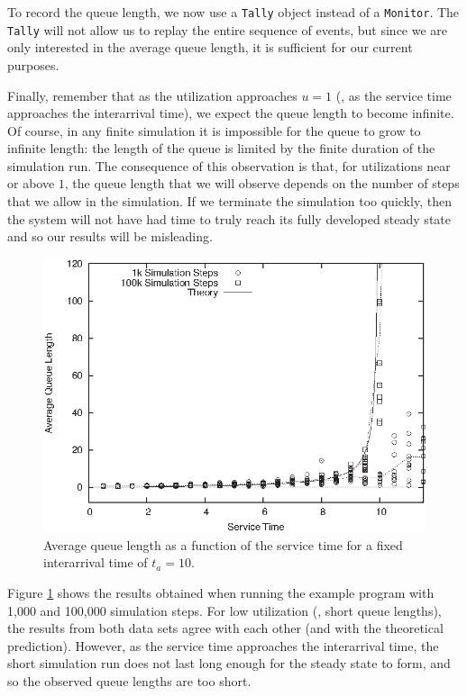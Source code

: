 To record the queue length, we now use a \texttt{Tally} object  instead
of a \texttt{Monitor}. The \texttt{Tally} will not allow us to replay
the entire sequence of events, but since we are only interested in the
average queue length, it is sufficient for our current purposes.

Finally, remember that as the utilization approaches $u=1$ (\ie, as
the service time approaches the interarrival time), we expect the queue
length to become infinite. Of course, in any finite simulation it is
impossible for the queue to grow to infinite length: the length of the
queue is limited by the finite duration of the simulation run.  The
consequence of this observation is that, for utilizations near or
above $1$, the queue length that we will observe depends on the number
of steps that we allow in the simulation. If we terminate the
simulation too quickly, then the system will not have had time to
truly reach its fully developed steady state and so our results will
be misleading.


\begin{figure}
  \centerline{\includegraphics{img/simpy3}}
  \caption{Average queue length as a function of the service time
    for a fixed interarrival time of $t_a = 10$.}
  \label{fig:simpy3}
\end{figure}

Figure \ref{fig:simpy3} shows the results obtained when running the
example program with 1,000 and 100,000 simulation steps. For low
utilization (\ie, short queue lengths), the results from both data
sets agree with each other (and with the theoretical prediction).
However, as the service time approaches the interarrival time, the
short simulation run does not last long enough for the steady state to
form, and so the observed queue lengths are too short.

